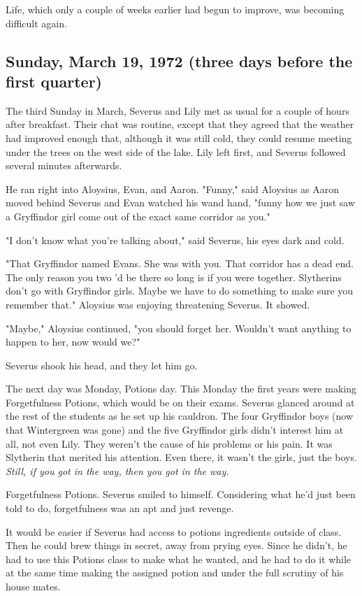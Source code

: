 \documentclass[a4paper,11pt]{article}
\begin{document}
Life, which only a couple of weeks earlier had begun to improve, was becoming difficult again.

\subsection{Sunday, March 19, 1972 (three days before the first quarter)}

The third Sunday in March, Severus and Lily met as usual for a couple of hours after breakfast. Their chat was routine, except that they agreed that the weather had improved enough that, although it was still cold, they could resume meeting under the trees on the west side of the lake. Lily left first, and Severus followed several minutes afterwards.

He ran right into Aloysius, Evan, and Aaron. "Funny," said Aloysius as Aaron moved behind Severus and Evan watched his wand hand, "funny how we just saw a Gryffindor girl come out of the exact same corridor as you."

"I don't know what you're talking about," said Severus, his eyes dark and cold.

"That Gryffindor named Evans. She was with you. That corridor has a dead end. The only reason you two 'd be there so long is if you were together. Slytherins don't go with Gryffindor girls. Maybe we have to do something to make sure you remember that." Aloysius was enjoying threatening Severus. It showed.

"Maybe," Aloysius continued, "you should forget her. Wouldn't want anything to happen to her, now would we?"

Severus shook his head, and they let him go.

The next day was Monday, Potions day. This Monday the first years were making Forgetfulness Potions, which would be on their exams. Severus glanced around at the rest of the students as he set up his cauldron. The four Gryffindor boys (now that Wintergreen was gone) and the five Gryffindor girls didn't interest him at all, not even Lily. They weren't the cause of his problems or his pain. It was Slytherin that merited his attention. Even there, it wasn't the girls, just the boys. \emph{Still, if you got in the way, then you got in the way.}

Forgetfulness Potions. Severus smiled to himself. Considering what he'd just been told to do, forgetfulness was an apt and just revenge.

It would be easier if Severus had access to potions ingredients outside of class. Then he could brew things in secret, away from prying eyes. Since he didn't, he had to use this Potions class to make what he wanted, and he had to do it while at the same time making the assigned potion and under the full scrutiny of his house mates.
\end{document}
